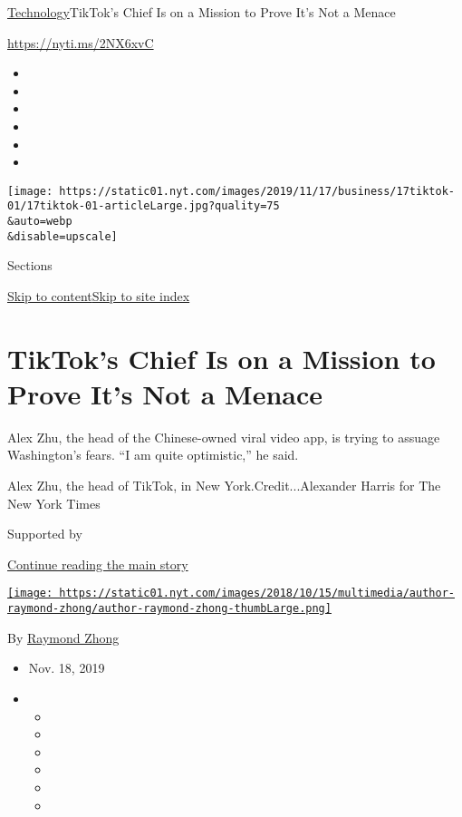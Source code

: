 \href{/section/technology}{Technology}\textbar{}TikTok's Chief Is on a
Mission to Prove It's Not a Menace

\url{https://nyti.ms/2NX6xvC}

\begin{itemize}
\item
\item
\item
\item
\item
\item
\end{itemize}

\texttt{[image: https://static01.nyt.com/images/2019/11/17/business/17tiktok-01/17tiktok-01-articleLarge.jpg?quality=75\\\&auto=webp\\\&disable=upscale]}

Sections

\protect\hyperlink{site-content}{Skip to
content}\protect\hyperlink{site-index}{Skip to site index}

\hypertarget{tiktoks-chief-is-on-a-mission-to-prove-its-not-a-menace}{%
\section{TikTok's Chief Is on a Mission to Prove It's Not a
Menace}\label{tiktoks-chief-is-on-a-mission-to-prove-its-not-a-menace}}

Alex Zhu, the head of the Chinese-owned viral video app, is trying to
assuage Washington's fears. ``I am quite optimistic,'' he said.

Alex Zhu, the head of TikTok, in New York.Credit...Alexander Harris for
The New York Times

Supported by

\protect\hyperlink{after-sponsor}{Continue reading the main story}

\href{https://www.nytimes.com/by/raymond-zhong}{\texttt{[image: https://static01.nyt.com/images/2018/10/15/multimedia/author-raymond-zhong/author-raymond-zhong-thumbLarge.png]}}

By \href{https://www.nytimes.com/by/raymond-zhong}{Raymond Zhong}

\begin{itemize}
\item
  Nov. 18, 2019
\item
  \begin{itemize}
  \item
  \item
  \item
  \item
  \item
  \item
  \end{itemize}
\end{itemize}


